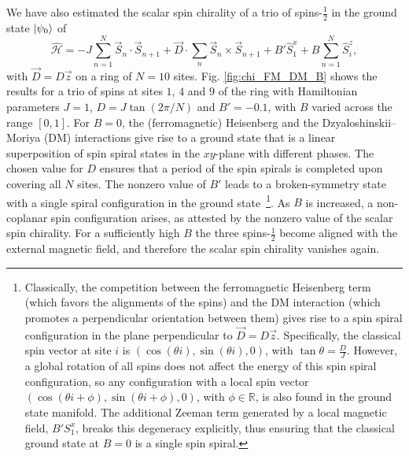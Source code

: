 \documentclass[aps,prl,twocolumn]{revtex4}
\begin{document}
We have also estimated the scalar spin chirality of a trio of spins-$\frac{1}{2}$ in the ground state $\ket{\psi_0}$ of 
\begin{equation}
\hat{\mathcal{H}} = -J \sum_{n=1}^{N}\vec{S}_n\cdot\vec{S}_{n+1} + \vec{D} \cdot\sum_n
\vec{S}_n\times\vec{S}_{n+1} + B' \hat{S}_1^x + B \sum_{n = 1}^{N} \hat{S}_i^z, 
\label{eq:Hamiltonian}
\end{equation}
with $\vec{D} = D \vec{z}$ on a ring of $N=10$ sites. Fig. \ref{fig:chi_FM_DM_B} shows the results for a trio of spins at sites $1$, $4$ and $9$ of the ring with Hamiltonian parameters $J = 1$, $D = J \tan (2\pi/N)$ and $B' = -0.1$, with $B$ varied across the range $[0,1]$. For $B = 0$, the (ferromagnetic) Heisenberg and the Dzyaloshinskii–Moriya (DM) interactions give rise to a ground state that is a linear superposition of spin spiral states in the $xy$-plane with different phases. The chosen value for $D$ ensures that a period of the spin spirals is completed upon covering all $N$ sites. The nonzero value of $B'$ leads to a broken-symmetry state with a single spiral configuration in the ground state~\footnote{Classically, the competition between the ferromagnetic Heisenberg term (which favors the alignments of the spins) and the DM interaction (which promotes a perpendicular orientation between them) gives rise to a spin spiral configuration in the plane perpendicular to $\vec{D} = D\vec{z}$. Specifically, the classical spin vector at site $i$ is $(\cos (\theta i), \sin (\theta i), 0)$, with $\tan \theta = \frac{D}{J}$. However, a global rotation of all spins does not affect the energy of this spin spiral configuration, so any configuration with a local spin vector $(\cos (\theta i + \phi), \sin (\theta i + \phi), 0)$, with $\phi \in \mathbb{R}$, is also found in the ground state manifold. The additional Zeeman term generated by a local magnetic field, $B' S^{x}_{1}$, breaks this degeneracy explicitly, thus ensuring that the classical ground state at $B = 0$ is a single spin spiral.}. As $B$ is increased, a non-coplanar spin configuration arises, as attested by the nonzero value of the scalar spin chirality. For a sufficiently high $B$ the three spins-$\frac{1}{2}$ become aligned with the external magnetic field, and therefore the scalar spin chirality vanishes again.
\end{document}
